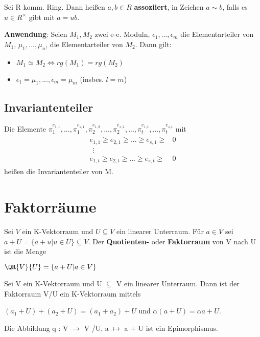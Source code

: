 \begin{remark}
Sei R komm. Ring. Dann heißen $a,b \in R$ \textbf{assoziiert}, in Zeichen $a \sim b$, falls es $u \in R^\times$ gibt mit $a=ub$.

\textbf{Anwendung}: Seien $M_1,M_2$ zwei e-e. Moduln, $\epsilon_1,...,\epsilon_m$ die Elementarteiler von $M_1$, $\mu_1,...,\mu_n$, die Elementarteiler von $M_2$. Dann gilt:
\begin{itemize}
	\item $M_1 \simeq M_2 \Leftrightarrow rg(M_1) = rg(M_2)$
	\item $\epsilon_1 = \mu_1,...,\epsilon_m = \mu_m$ (insbes. $l=m$) %
\end{itemize}
\end{remark}

\subsection{Invariantenteiler}
\begin{definition}
Die Elemente $\pi_1^{e_{1,1}},...,\pi_1^{e_{s,1}},\pi_2^{e_{1,2}},...,\pi_2^{e_{s,2}},...,\pi_t^{e_{1,t}},...,\pi_t^{e_{s,t}}$ mit 
\begin{align*}
\begin{array}{ll}
e_{1,1} \geq e_{2,1} \geq ... \geq e_{s,1} \geq & 0 \\ 
~~\vdots & \\ 
e_{1,t} \geq e_{2,t} \geq ... \geq e_{s,t} \geq & 0
\end{array} 
\end{align*}
heißen die Invariantenteiler von M.
\end{definition}

\section{Faktorräume}
\begin{definition}
Sei $V$ ein K-Vektorraum und $U \subseteq V$ ein linearer Unterraum. Für $a \in V$ sei $a + U = \{a + u | u \in U\} \subseteq V$. Der \textbf{Quotienten-} oder \textbf{Faktorraum} von V nach U ist die Menge 
\begin{center}
$\QR{V}{U} = \{a + U | a \in V\}$
\end{center}
\end{definition}

\begin{lemma}
Sei V ein K-Vektorraum und U $\subseteq$ V ein linearer Unterraum. Dann ist der Faktorraum V/U ein K-Vektorraum mittels
\begin{center}
$(a_1 + U)+(a_2 + U)=(a_1 +a_2)+U$ und $\alpha(a+U)=\alpha a+U$.
\end{center} 
Die Abbildung q : V $\to$ V /U, a $\mapsto$ a + U ist ein Epimorphismus.
\end{lemma}

